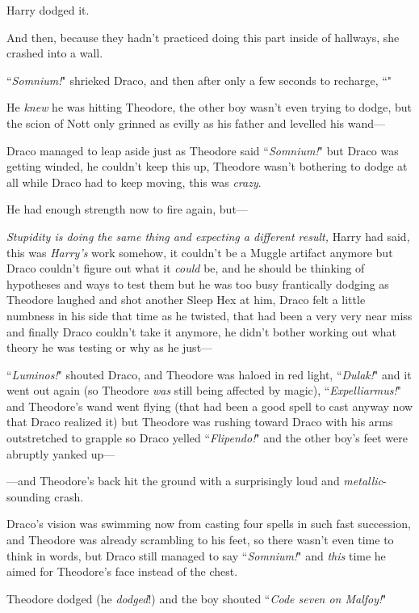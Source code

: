 Harry dodged it.

And then, because they hadn't practiced doing this part inside of hallways, she crashed into a wall.

\later

``\emph{Somnium!}" shrieked Draco, and then after only a few seconds to recharge, ``"

He \emph{knew} he was hitting Theodore, the other boy wasn't even trying to dodge, but the scion of Nott only grinned as evilly as his father and levelled his wand—

Draco managed to leap aside just as Theodore said ``\emph{Somnium!}" but Draco was getting winded, he couldn't keep this up, Theodore wasn't bothering to dodge at all while Draco had to keep moving, this was \emph{crazy}.

He had enough strength now to fire again, but—

\emph{Stupidity is doing the same thing and expecting a different result,} Harry had said, this was \emph{Harry's} work somehow, it couldn't be a Muggle artifact anymore but Draco couldn't figure out what it \emph{could} be, and he should be thinking of hypotheses and ways to test them but he was too busy frantically dodging as Theodore laughed and shot another Sleep Hex at him, Draco felt a little numbness in his side that time as he twisted, that had been a very very near miss and finally Draco couldn't take it anymore, he didn't bother working out what theory he was testing or why as he just—

``\emph{Luminos!}" shouted Draco, and Theodore was haloed in red light, ``\emph{Dulak!}" and it went out again (so Theodore \emph{was} still being affected by magic), ``\emph{Expelliarmus!}" and Theodore's wand went flying (that had been a good spell to cast anyway now that Draco realized it) but Theodore was rushing toward Draco with his arms outstretched to grapple so Draco yelled ``\emph{Flipendo!}" and the other boy's feet were abruptly yanked up—

—and Theodore's back hit the ground with a surprisingly loud and \emph{metallic}-sounding crash.

Draco's vision was swimming now from casting four spells in such fast succession, and Theodore was already scrambling to his feet, so there wasn't even time to think in words, but Draco still managed to say ``\emph{Somnium!}" and \emph{this} time he aimed for Theodore's face instead of the chest.

Theodore dodged (he \emph{dodged}!) and the boy shouted ``\emph{Code seven on Malfoy!}"

